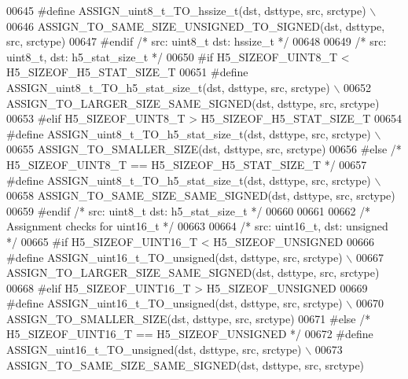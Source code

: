 \begin{DoxyCode}
00645 \textcolor{preprocessor}{    #define ASSIGN\_uint8\_t\_TO\_hssize\_t(dst, dsttype, src, srctype) \(\backslash\)}
00646 \textcolor{preprocessor}{        ASSIGN\_TO\_SAME\_SIZE\_UNSIGNED\_TO\_SIGNED(dst, dsttype, src, srctype)}
00647 \textcolor{preprocessor}{#endif }\textcolor{comment}{/* src: uint8\_t dst: hssize\_t */}\textcolor{preprocessor}{}
00648 
00649 \textcolor{comment}{/* src: uint8\_t, dst: h5\_stat\_size\_t */}
00650 \textcolor{preprocessor}{#if H5\_SIZEOF\_UINT8\_T < H5\_SIZEOF\_H5\_STAT\_SIZE\_T}
00651 \textcolor{preprocessor}{    #define ASSIGN\_uint8\_t\_TO\_h5\_stat\_size\_t(dst, dsttype, src, srctype) \(\backslash\)}
00652 \textcolor{preprocessor}{        ASSIGN\_TO\_LARGER\_SIZE\_SAME\_SIGNED(dst, dsttype, src, srctype)}
00653 \textcolor{preprocessor}{#elif H5\_SIZEOF\_UINT8\_T > H5\_SIZEOF\_H5\_STAT\_SIZE\_T}
00654 \textcolor{preprocessor}{    #define ASSIGN\_uint8\_t\_TO\_h5\_stat\_size\_t(dst, dsttype, src, srctype) \(\backslash\)}
00655 \textcolor{preprocessor}{        ASSIGN\_TO\_SMALLER\_SIZE(dst, dsttype, src, srctype)}
00656 \textcolor{preprocessor}{#else }\textcolor{comment}{/* H5\_SIZEOF\_UINT8\_T == H5\_SIZEOF\_H5\_STAT\_SIZE\_T */}\textcolor{preprocessor}{}
00657 \textcolor{preprocessor}{    #define ASSIGN\_uint8\_t\_TO\_h5\_stat\_size\_t(dst, dsttype, src, srctype) \(\backslash\)}
00658 \textcolor{preprocessor}{        ASSIGN\_TO\_SAME\_SIZE\_SAME\_SIGNED(dst, dsttype, src, srctype)}
00659 \textcolor{preprocessor}{#endif }\textcolor{comment}{/* src: uint8\_t dst: h5\_stat\_size\_t */}\textcolor{preprocessor}{}
00660 
00661 
00662 \textcolor{comment}{/* Assignment checks for uint16\_t */}
00663 
00664 \textcolor{comment}{/* src: uint16\_t, dst: unsigned */}
00665 \textcolor{preprocessor}{#if H5\_SIZEOF\_UINT16\_T < H5\_SIZEOF\_UNSIGNED}
00666 \textcolor{preprocessor}{    #define ASSIGN\_uint16\_t\_TO\_unsigned(dst, dsttype, src, srctype) \(\backslash\)}
00667 \textcolor{preprocessor}{        ASSIGN\_TO\_LARGER\_SIZE\_SAME\_SIGNED(dst, dsttype, src, srctype)}
00668 \textcolor{preprocessor}{#elif H5\_SIZEOF\_UINT16\_T > H5\_SIZEOF\_UNSIGNED}
00669 \textcolor{preprocessor}{    #define ASSIGN\_uint16\_t\_TO\_unsigned(dst, dsttype, src, srctype) \(\backslash\)}
00670 \textcolor{preprocessor}{        ASSIGN\_TO\_SMALLER\_SIZE(dst, dsttype, src, srctype)}
00671 \textcolor{preprocessor}{#else }\textcolor{comment}{/* H5\_SIZEOF\_UINT16\_T == H5\_SIZEOF\_UNSIGNED */}\textcolor{preprocessor}{}
00672 \textcolor{preprocessor}{    #define ASSIGN\_uint16\_t\_TO\_unsigned(dst, dsttype, src, srctype) \(\backslash\)}
00673 \textcolor{preprocessor}{        ASSIGN\_TO\_SAME\_SIZE\_SAME\_SIGNED(dst, dsttype, src, srctype)}

\end{DoxyCode}
